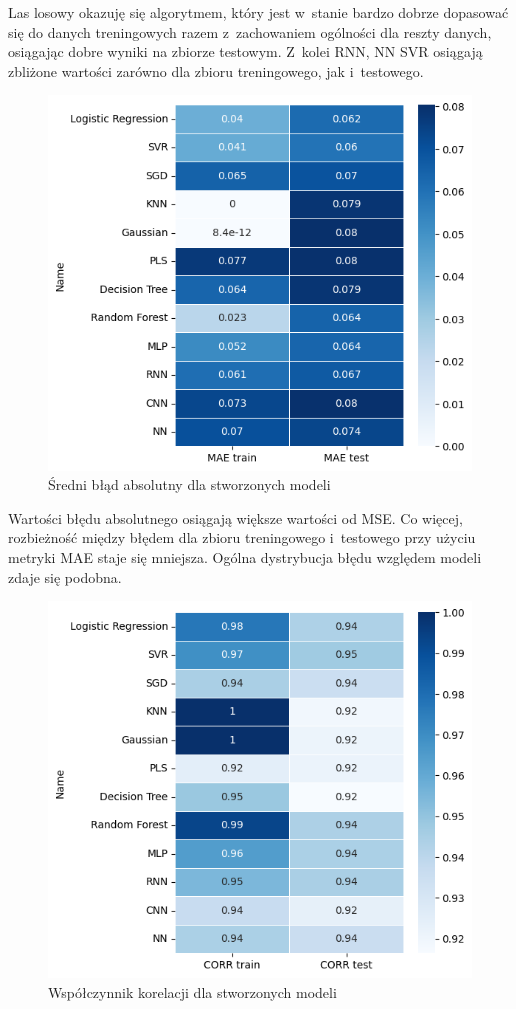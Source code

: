 Las losowy okazuję się algorytmem, który jest w~stanie bardzo dobrze 
dopasować się do danych treningowych razem z~zachowaniem ogólności dla 
reszty danych, osiągając dobre wyniki na zbiorze testowym. Z~kolei RNN, NN
SVR osiągają zbliżone wartości zarówno dla zbioru treningowego, jak i~testowego.

\begin{figure}[H]
    \centering
    \includegraphics[width=\textwidth]{images/mae.png}
    \caption{Średni błąd absolutny dla stworzonych modeli}
    \label{mae}
\end{figure}

Wartości błędu absolutnego osiągają większe wartości od MSE. Co więcej,
rozbieżność między błędem dla zbioru treningowego i~testowego
przy użyciu metryki MAE staje się mniejsza. Ogólna dystrybucja błędu 
względem modeli zdaje się podobna.

\begin{figure}[H]
    \centering
    \includegraphics[width=\textwidth]{images/corr.png}
    \caption{Współczynnik korelacji dla stworzonych modeli}
    \label{corr}
\end{figure}


